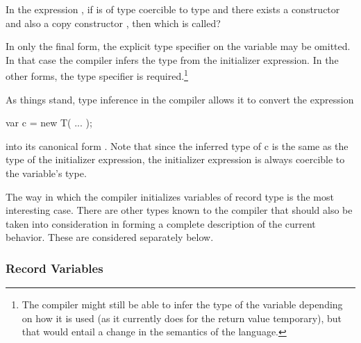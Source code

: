 \begin{future}
In the expression , if  is of type  coercible
to type  and there exists a constructor
 and also a copy constructor , then which is called?
\end{future}

In only the final form, the explicit type specifier on the variable may be omitted.  In that
case the compiler infers the type from the initializer expression.  In the other forms,
the type specifier is required.\footnote{The compiler might still be able to infer the type of the
variable depending on how it is used (as it currently does for the return value
temporary), but that would entail a change in the semantics of the language.}

As things stand, type inference in the compiler allows it to convert the
expression
\begin{chapel}
   var c = new T( ... );
\end{chapel}
\noindent
into its canonical form .  Note that since the inferred type
of c is the same as the type of the initializer expression, the initializer expression is
always coercible to the variable's type.

The way in which the compiler initializes variables of record type is the most interesting
case.  There are other types known to the compiler that should also be taken into
consideration in forming a complete description of the current behavior.  These are
considered separately below.


\subsubsection{Record Variables}

